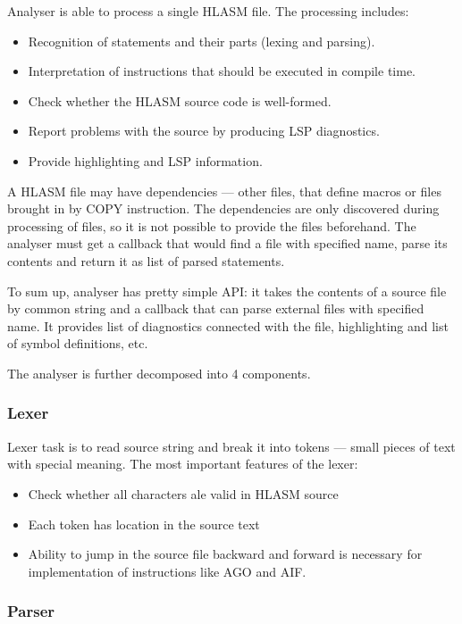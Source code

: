 Analyser is able to process a single HLASM file. The processing includes:
\begin{itemize}
 \item Recognition of statements and their parts (lexing and parsing).
 \item Interpretation of instructions that should be executed in compile time.
 \item Check whether the HLASM source code is well-formed.
 \item Report problems with the source by producing LSP diagnostics.
 \item Provide highlighting and LSP information.
\end{itemize}

A HLASM file may have dependencies --- other files, that define macros or files brought in by COPY instruction. The dependencies are only discovered during processing of files, so it is not possible to provide the files beforehand. The analyser must get a callback that would find a file with specified name, parse its contents and return it as list of parsed statements. 

To sum up, analyser has pretty simple API: it takes the contents of a source file by common string and a callback that can parse external files with specified name. It provides list of diagnostics connected with the file, highlighting and list of symbol definitions, etc.

The analyser is further decomposed into 4 components.

\subsubsection{Lexer}

Lexer task is to read source string and break it into tokens --- small pieces of text with special meaning. The most important features of the lexer:
\begin{itemize}
	\item Check whether all characters ale valid in HLASM source
	\item Each token has location in the source text
	\item Ability to jump in the source file backward and forward is necessary for implementation of instructions like AGO and AIF.
\end{itemize}

\subsubsection{Parser}

